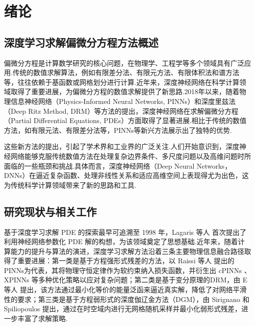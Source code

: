 \chapter{绪论}

\section{深度学习求解偏微分方程方法概述}
偏微分方程是计算数学研究的核心问题，在物理学、工程学等多个领域具有广泛应用.传统的数值求解算法，例如有限差分法、有限元方法、有限体积法和谱方法等，往往依赖于基函数或网格划分进行计算.近年来，深度神经网络在科学计算领域取得了重要进展，为偏微分方程的数值求解提供了新思路.2018年以来，随着物理信息神经网络（Physics-Informed Neural Networks, PINNs）和深度里兹法（Deep Ritz Method, DRM）等方法的提出，深度神经网络在求解偏微分方程（Partial Differential Equations, PDEs）方面取得了显著进展.相比于传统的数值方法，如有限元法、有限差分法等，PINNs等新兴方法展示出了独特的优势.

这些新方法的提出，引起了学术界和工业界的广泛关注.人们开始意识到，深度神经网络能够克服传统数值方法在处理复杂边界条件、多尺度问题以及高维问题时所面临的一些瓶颈和挑战.具体而言，深度神经网络（Deep Neural Networks，DNNs）在逼近复杂函数、处理非线性关系和适应高维空间上表现得尤为出色，这为传统科学计算领域带来了新的思路和工具.


\section{研究现状与相关工作}\label{sec-compile}

基于深度学习求解 PDE 的探索最早可追溯至 1998 年，Lagaris 等人 \cite{lagaris1998artificial} 首次提出了利用神经网络参数化 PDE 解的构想，为该领域奠定了思想基础.近年来，随着计算能力的提升与算法的演进，深度学习求解方法沿着三条主要物理信息融合路径取得了重要进展：第一类是基于方程强形式残差的方法，以 Raissi 等人 \cite{raissi2019physics, raissi2017physics} 提出的PINNs为代表，其将物理守恒定律作为软约束纳入损失函数，并衍生出 cPINNs \cite{jagtap2020conservative}、XPINNs \cite{jagtap2021extended,Pang2018fPINNsFP,gu2021selectnet,lu2021deepxde} 等多种优化策略以应对复杂问题\cite{GUO2022115523,han2018solving}；第二类是基于变分原理的DRM，由 E 等人 \cite{Weinan2017The} 提出，该方法通过最小化等价的能量泛函来逼近真实解，降低了对网络平滑性的要求；第三类是基于方程弱形式的深度伽辽金方法（DGM），由 Sirignano 和 Spiliopoulos \cite{Justin2018DGM} 提出，通过在时空域内进行无网格随机采样并最小化弱形式残差，进一步丰富了求解策略\cite{wan2020zang,chen2023friedrichs}.

